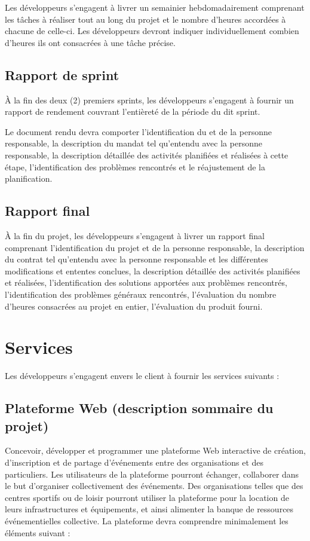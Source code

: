 \documentclass[letter,12pt]{exam}
\begin{document}
Les développeurs s'engagent à livrer un semainier hebdomadairement
comprenant les tâches à réaliser tout au long du projet et le nombre
d'heures accordées à chacune de celle-ci. Les développeurs devront
indiquer individuellement combien d'heures ils ont consacrées à une tâche
précise.

\subsection{Rapport de sprint}

À la fin des deux (2) premiers sprints, les développeurs s'engagent à fournir un
rapport de rendement couvrant l'entièreté de la période du dit sprint.

Le document rendu devra comporter l'identification du et de la personne
responsable, la description du mandat tel qu'entendu avec la personne
responsable, la description détaillée des activités planifiées et
réalisées à cette étape, l'identification des problèmes rencontrés et le
réajustement de la planification.

\subsection{Rapport final}

À la fin du projet, les développeurs s'engagent à livrer un rapport
final comprenant l'identification du projet et de la personne
responsable, la description du contrat tel qu'entendu avec la personne
responsable et les différentes modifications et ententes conclues, la
description détaillée des activités planifiées et réalisées,
l'identification des solutions apportées aux problèmes rencontrés,
l'identification des problèmes généraux rencontrés, l'évaluation du
nombre d'heures consacrées au projet en entier, l'évaluation du produit
fourni.

\section{Services}

Les développeurs s'engagent envers le client à fournir les services
suivants :

\subsection{Plateforme Web (description sommaire du
projet)}

Concevoir, développer et programmer une plateforme Web interactive de
création, d'inscription et de partage d'événements entre des
organisations et des particuliers. Les utilisateurs de la plateforme
pourront échanger, collaborer dans le but d'organiser collectivement des
événements. Des organisations telles que des centres sportifs ou de loisir
pourront utiliser la plateforme pour la location de leurs
infrastructures et équipements, et ainsi alimenter la banque de
ressources événementielles collective. La plateforme devra comprendre
minimalement les éléments suivant :
\end{document}
